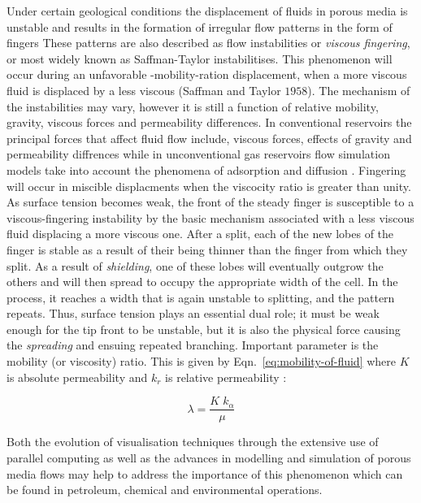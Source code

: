 \documentclass[preprint,authoryear,12pt]{elsarticle}
\newcommand{\red}{\textcolor{red}}
\begin{document}
\medskip
Under certain geological conditions the displacement of fluids in porous media is unstable and results in the formation of irregular flow patterns in the form of fingers %
These patterns are also described as flow instabilities or \textit{viscous fingering},  or most widely known as Saffman-Taylor instabilitises. This phenomenon will occur during an unfavorable -mobility-ration displacement, when a more viscous fluid is displaced by a less viscous (Saffman and Taylor $1958$). The mechanism of the instabilities may vary, 
however it is still a function of relative mobility, gravity, viscous forces and permeability differences. In conventional reservoirs the principal forces that affect fluid flow include, viscous forces, effects of gravity and permeability diffrences while in unconventional gas reservoirs flow simulation models take into account the phenomena of adsorption and diffusion \citep{abdus_2015}.
Fingering will occur in miscible displacments when the viscocity ratio is greater than unity. As surface tension becomes weak, the front of the steady finger is susceptible to a viscous-fingering instability by the basic mechanism associated with a less viscous fluid displacing a more viscous one. After a split, each of the new lobes of the finger is stable as a result of their being thinner than the finger from which they split. As a result of \textit{shielding}, one of these lobes will eventually outgrow the others and will then spread to occupy the appropriate width of the cell. In the process, it reaches a width that is again unstable to splitting, and the pattern repeats. Thus, surface tension plays an essential dual role; it must be weak enough for the tip front to be unstable, but it is also the physical force causing the \textit{spreading} and ensuing repeated branching. Important parameter is the mobility (or viscosity) ratio. This is given by Eqn.~\ref{eq:mobility-of-fluid} where $K$ is absolute permeability and $k_{r}$ is relative permeability :

\begin{equation}
\lambda = \frac{K\;k_{\alpha}}{\mu}
\label{eq:mobility-of-fluid}
\end{equation}

 Both the evolution of visualisation techniques through the extensive use of parallel computing as well as the advances in modelling and simulation of porous media flows may help to address the importance of this phenomenon which can be found in petroleum, chemical and environmental operations.
\end{document}
